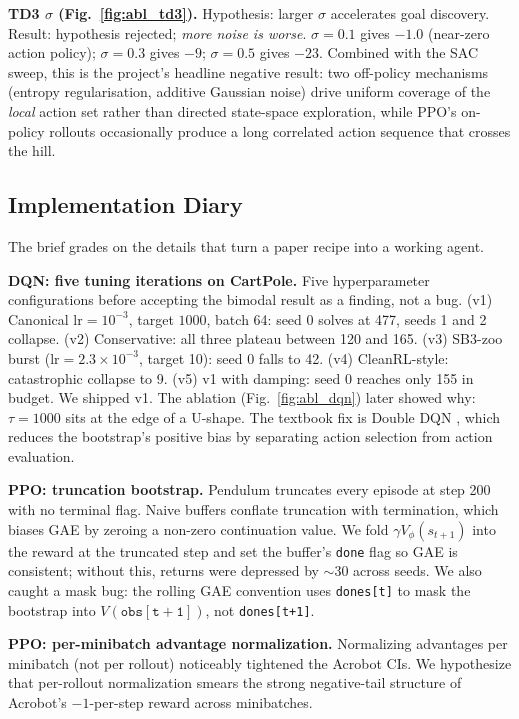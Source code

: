\documentclass{article}
\begin{document}
\textbf{TD3 $\sigma$ (Fig.~\ref{fig:abl_td3}).} Hypothesis: larger $\sigma$ accelerates goal discovery. Result: hypothesis rejected; \emph{more noise is worse}. $\sigma{=}0.1$ gives $-1.0$ (near-zero action policy); $\sigma{=}0.3$ gives $-9$; $\sigma{=}0.5$ gives $-23$. Combined with the SAC sweep, this is the project's headline negative result: two off-policy mechanisms (entropy regularisation, additive Gaussian noise) drive uniform coverage of the \emph{local} action set rather than directed state-space exploration, while PPO's on-policy rollouts occasionally produce a long correlated action sequence that crosses the hill.

\subsection{Implementation Diary}
\label{sec:diary}

The brief grades on the details that turn a paper recipe into a working agent.

\textbf{DQN: five tuning iterations on CartPole.} Five hyperparameter configurations before accepting the bimodal result as a finding, not a bug. (v1) Canonical $\mathrm{lr}{=}10^{-3}$, target $1000$, batch 64: seed 0 solves at 477, seeds 1 and 2 collapse. (v2) Conservative: all three plateau between 120 and 165. (v3) SB3-zoo burst ($\mathrm{lr}{=}2.3\!\times\!10^{-3}$, target 10): seed 0 falls to 42. (v4) CleanRL-style: catastrophic collapse to 9. (v5) v1 with damping: seed 0 reaches only 155 in budget. We shipped v1. The ablation (Fig.~\ref{fig:abl_dqn}) later showed why: $\tau{=}1000$ sits at the edge of a U-shape. The textbook fix is Double DQN \cite{vanhasselt2016double}, which reduces the bootstrap's positive bias by separating action selection from action evaluation.

\textbf{PPO: truncation bootstrap.} Pendulum truncates every episode at step 200 with no terminal flag. Naive buffers conflate truncation with termination, which biases GAE by zeroing a non-zero continuation value. We fold $\gamma V_\phi(s_{t+1})$ into the reward at the truncated step and set the buffer's \texttt{done} flag so GAE is consistent; without this, returns were depressed by $\sim 30$ across seeds. We also caught a mask bug: the rolling GAE convention uses \texttt{dones[t]} to mask the bootstrap into $V(\mathtt{obs[t+1]})$, not \texttt{dones[t+1]}.

\textbf{PPO: per-minibatch advantage normalization.} Normalizing advantages per minibatch (not per rollout) noticeably tightened the Acrobot CIs. We hypothesize that per-rollout normalization smears the strong negative-tail structure of Acrobot's $-1$-per-step reward across minibatches.
\end{document}
